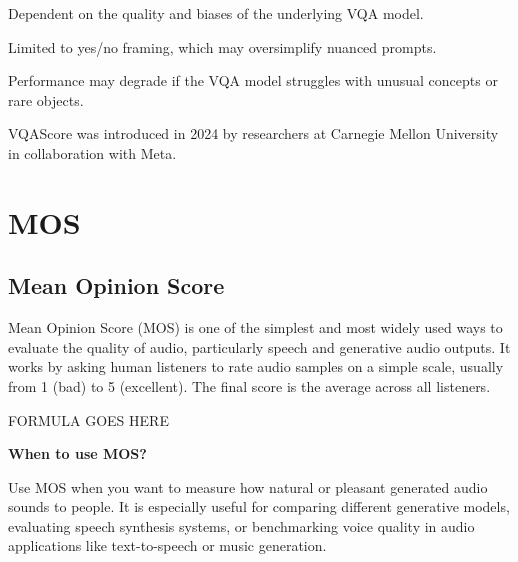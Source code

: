 {
\item Dependent on the quality and biases of the underlying VQA model.
\item Limited to yes/no framing, which may oversimplify nuanced prompts.
\item Performance may degrade if the VQA model struggles with unusual concepts or rare objects.
}

\clearpage

\thispagestyle{customstyle}

{VQAScore was introduced in 2024 by researchers at Carnegie Mellon University in collaboration with Meta.}


\clearpage
\thispagestyle{genaistyle}
\section{MOS}
\subsection{Mean Opinion Score}


Mean Opinion Score (MOS) is one of the simplest and most widely used ways to evaluate the quality of audio, particularly speech and
generative audio outputs. It works by asking human listeners to rate audio samples on a simple scale, usually from 1 (bad) to 5 (excellent).
The final score is the average across all listeners.

\begin{center}
    FORMULA GOES HERE
\end{center}

\textbf{When to use MOS?}

Use MOS when you want to measure how natural or pleasant generated audio sounds to people. It is especially useful for comparing different
generative models, evaluating speech synthesis systems, or benchmarking voice quality in audio applications like
text-to-speech or music generation.

